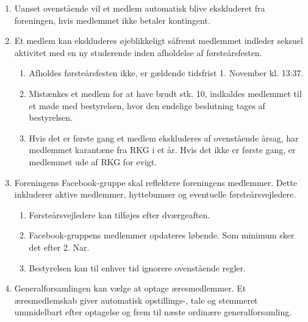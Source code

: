 \documentclass[a4paper, 10pt]{article}
\renewcommand\thesection{\textsection\arabic{section}}
\newenvironment{stykenum}{
  \begin{enumerate}[%
    label=Stk.~\arabic*:, ref=\thesection~Stk.~\arabic{enumi}, start=1]
}{\end{enumerate}}
\newenvironment{substykenum}{
  \begin{enumerate}[%
          label=Stk.~\arabic{enumi}.\arabic*:,
      ref=\thesection~Stk.~\arabic{enumi}.\arabic*, start=1]
}{\end{enumerate}}
\begin{document}
\begin{stykenum}
    \item Uanset ovenstående vil et medlem automatisk blive ekskluderet fra
        foreningen, hvis medlemmet ikke betaler kontingent.

    \item Et medlem kan ekskluderes øjeblikkeligt såfremt medlemmet indleder
        seksuel aktivitet med en ny studerende inden afholdelse af
        førsteårsfesten.
        \begin{substykenum}
            \item Afholdes førsteårsfesten ikke, er gældende tidsfrist 1.
                November kl. 13:37.

            \item Mistænkes et medlem for at have brudt stk. 10, indkaldes
                medlemmet til et møde med bestyrelsen, hvor den endelige
                beslutning tages af bestyrelsen.

            \item Hvis det er første gang et medlem ekskluderes af ovenstående
                årsag, har medlemmet karantæne fra RKG i et år. Hvis det ikke er
                første gang, er medlemmet ude af RKG for evigt.
        \end{substykenum}

    \item Foreningens Facebook-gruppe skal reflektere foreningens medlemmer.
        Dette inkluderer aktive medlemmer, hyttebumser og eventuelle
        førsteårsvejledere.
        \begin{substykenum}
            \item Førsteårsvejledere kan tilføjes efter dværgeaften.

            \item Facebook-gruppens medlemmer opdateres løbende. Som minimum
                sker det efter 2. Nar.

            \item Bestyrelsen kan til enhver tid ignorere ovenstående
                regler.

        \end{substykenum}

    \item \label{aeresmedlemmer} Generalforsamlingen kan vælge at optage
      æresmedlemmer. Et æresmedlemskab giver automatisk opstillings-, tale og
      stemmeret ummidelbart efter optagelse og frem til næste ordinære
      generalforsamling.
\end{stykenum}
\end{document}
